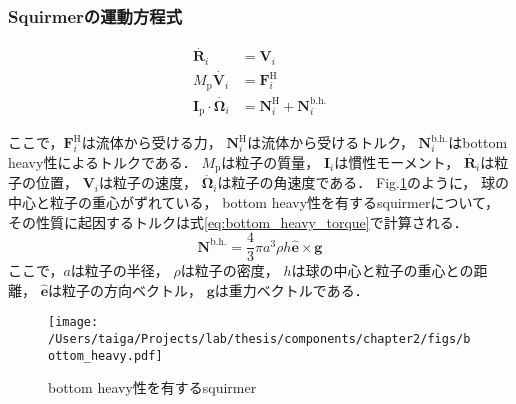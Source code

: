 \subsubsection{Squirmerの運動方程式}
\label{sec:equation_of_motion}
    \begin{align}
        \dot{\boldsymbol{R}_i} &= \boldsymbol{V}_i \\
        M_\mathrm{p} \dot{\boldsymbol{V}_i} &= \boldsymbol{F}^\mathrm{H}_i \\
        \boldsymbol{I}_\mathrm{p} \cdot \dot{\boldsymbol{\Omega}_i} &=
            \boldsymbol{N}^\mathrm{H}_i + \boldsymbol{N}^\mathrm{b.h.}_i
    \end{align}

ここで，$\boldsymbol{F}^\mathrm{H}_i$は流体から受ける力，
$\boldsymbol{N}^\mathrm{H}_i$は流体から受けるトルク，
$\boldsymbol{N}^\mathrm{b.h.}_i$はbottom heavy性によるトルクである．
$M_\mathrm{p}$は粒子の質量，
$\boldsymbol{I}_i$は慣性モーメント，
$\dot{\boldsymbol{R}_i}$は粒子の位置，
$\boldsymbol{V}_i$は粒子の速度，
$\dot{\boldsymbol{\Omega}_i}$は粒子の角速度である．
Fig.\ref{fig:bottom_heaviness}のように，
球の中心と粒子の重心がずれている，
bottom heavy性を有するsquirmerについて，
その性質に起因するトルクは式\eqref{eq:bottom_heavy_torque}で計算される\cite{dilute_squirmer}．
    \begin{equation}
        \boldsymbol{N}^\mathrm{b.h.} = \frac{4}{3} \pi a^3 \rho h \boldsymbol{\hat{e}} \times \boldsymbol{g}
        \label{eq:bottom_heavy_torque}
    \end{equation}
ここで，$a$は粒子の半径，
$\rho$は粒子の密度，
$h$は球の中心と粒子の重心との距離，
$\boldsymbol{\hat{e}}$は粒子の方向ベクトル，
$\boldsymbol{g}$は重力ベクトルである．
    \begin{figure}[htbp]
        \centering
        \texttt{[image: /Users/taiga/Projects/lab/thesis/components/chapter2/figs/bottom\_heavy.pdf]}
        \caption{bottom heavy性を有するsquirmer}
        \label{fig:bottom_heaviness}
    \end{figure}
